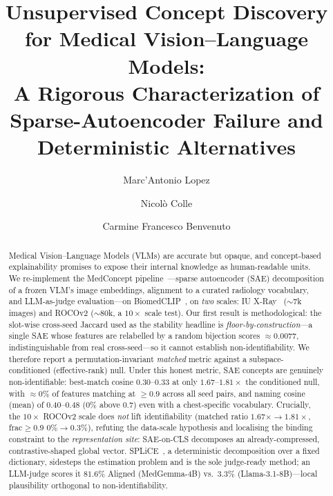\documentclass[sigconf, nonacm]{acmart}
\begin{document}
\title{Unsupervised Concept Discovery for Medical Vision--Language Models:\\A Rigorous Characterization of Sparse-Autoencoder Failure and Deterministic Alternatives}

\author{Marc'Antonio Lopez}

\author{Nicolò Colle}

\author{Carmine Francesco Benvenuto}

\begin{abstract}
Medical Vision--Language Models (VLMs) are accurate but opaque, and concept-based explainability promises to expose their internal knowledge as human-readable units. We re-implement the MedConcept pipeline~\cite{haque2026medconcept}---sparse autoencoder (SAE) decomposition of a frozen VLM's image embeddings, alignment to a curated radiology vocabulary, and LLM-as-judge evaluation---on BiomedCLIP~\cite{zhang2023biomedclip}, on \emph{two} scales: IU X-Ray~\cite{demner2016iuxray} (${\sim}7$k images) and ROCOv2 (${\sim}80$k, a $10{\times}$ scale test). Our first result is methodological: the slot-wise cross-seed Jaccard used as the stability headline is \emph{floor-by-construction}---a single SAE whose features are relabelled by a random bijection scores ${\approx}0.0077$, indistinguishable from real cross-seed---so it cannot establish non-identifiability. We therefore report a permutation-invariant \emph{matched} metric against a subspace-conditioned (effective-rank) null. Under this honest metric, SAE concepts are genuinely non-identifiable: best-match cosine $0.30$--$0.33$ at only $1.67$--$1.81{\times}$ the conditioned null, with ${\approx}0\%$ of features matching at $\geq0.9$ across all seed pairs, and naming cosine (mean) of $0.40$--$0.48$ ($0\%$ above $0.7$) even with a chest-specific vocabulary. Crucially, the $10{\times}$ ROCOv2 scale does \emph{not} lift identifiability (matched ratio $1.67{\times}{\to}1.81{\times}$, frac${\geq}0.9$ $0\%{\to}0.3\%$), refuting the data-scale hypothesis and localising the binding constraint to the \emph{representation site}: SAE-on-CLS decomposes an already-compressed, contrastive-shaped global vector. SPLiCE~\cite{bhalla2024spliece}, a deterministic decomposition over a fixed dictionary, sidesteps the estimation problem and is the sole judge-ready method; an LLM-judge scores it $81.6\%$ Aligned (MedGemma-4B) vs.\ $3.3\%$ (Llama-3.1-8B)---local plausibility orthogonal to non-identifiability.
\end{abstract}
\end{document}
